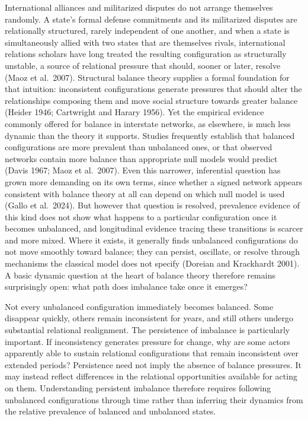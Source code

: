 \documentclass[Afour,sageh,times,doublespace]{sagej}
\begin{document}
International alliances and militarized disputes do not arrange themselves randomly. A state's formal defense commitments and its militarized disputes are relationally structured, rarely independent of one another, and when a state is simultaneously allied with two states that are themselves rivals, international relations scholars have long treated the resulting configuration as structurally unstable, a source of relational pressure that should, sooner or later, resolve (Maoz et al.~2007). Structural balance theory supplies a formal foundation for that intuition: inconsistent configurations generate pressures that should alter the relationships composing them and move social structure towards greater balance (Heider 1946; Cartwright and Harary 1956). Yet the empirical evidence commonly offered for balance in interstate networks, as elsewhere, is much less dynamic than the theory it supports. Studies frequently establish that balanced configurations are more prevalent than unbalanced ones, or that observed networks contain more balance than appropriate null models would predict (Davis 1967; Maoz et al.~2007). Even this narrower, inferential question has grown more demanding on its own terms, since whether a signed network appears consistent with balance theory at all can depend on which null model is used (Gallo et al.~2024). But however that question is resolved, prevalence evidence of this kind does not show what happens to a particular configuration once it becomes unbalanced, and longitudinal evidence tracing these transitions is scarcer and more mixed. Where it exists, it generally finds unbalanced configurations do not move smoothly toward balance; they can persist, oscillate, or resolve through mechanisms the classical model does not specify (Doreian and Krackhardt 2001). A basic dynamic question at the heart of balance theory therefore remains surprisingly open: what path does imbalance take once it emerges?

Not every unbalanced configuration immediately becomes balanced. Some disappear quickly, others remain inconsistent for years, and still others undergo substantial relational realignment. The persistence of imbalance is particularly important. If inconsistency generates pressure for change, why are some actors apparently able to sustain relational configurations that remain inconsistent over extended periods? Persistence need not imply the absence of balance pressures. It may instead reflect differences in the relational opportunities available for acting on them. Understanding persistent imbalance therefore requires following unbalanced configurations through time rather than inferring their dynamics from the relative prevalence of balanced and unbalanced states.
\end{document}
